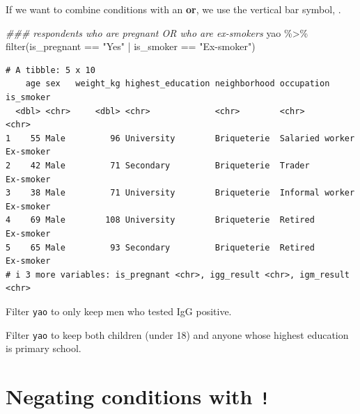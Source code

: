 \documentclass[
  letterpaper,
  DIV=11,
  numbers=noendperiod]{scrreprt}
\newenvironment{Shaded}{\begin{snugshade}}{\end{snugshade}}
\newcommand{\DocumentationTok}[1]{\textcolor[rgb]{0.37,0.37,0.37}{\textit{#1}}}
\newcommand{\FunctionTok}[1]{\textcolor[rgb]{0.28,0.35,0.67}{#1}}
\newcommand{\NormalTok}[1]{\textcolor[rgb]{0.00,0.23,0.31}{#1}}
\newcommand{\SpecialCharTok}[1]{\textcolor[rgb]{0.37,0.37,0.37}{#1}}
\newcommand{\StringTok}[1]{\textcolor[rgb]{0.13,0.47,0.30}{#1}}
\begin{document}
If we want to combine conditions with an \textbf{or}, we use the
vertical bar symbol, \texttt{\textbar{}}.

\begin{Shaded}
\begin{Highlighting}[]
\DocumentationTok{\#\#\# respondents who are pregnant OR who are ex{-}smokers}
\NormalTok{yao }\SpecialCharTok{\%\textgreater{}\%} \FunctionTok{filter}\NormalTok{(is\_pregnant }\SpecialCharTok{==} \StringTok{"Yes"} \SpecialCharTok{|}\NormalTok{ is\_smoker }\SpecialCharTok{==} \StringTok{"Ex{-}smoker"}\NormalTok{)}
\end{Highlighting}
\end{Shaded}

\begin{verbatim}
# A tibble: 5 x 10
    age sex   weight_kg highest_education neighborhood occupation      is_smoker
  <dbl> <chr>     <dbl> <chr>             <chr>        <chr>           <chr>    
1    55 Male         96 University        Briqueterie  Salaried worker Ex-smoker
2    42 Male         71 Secondary         Briqueterie  Trader          Ex-smoker
3    38 Male         71 University        Briqueterie  Informal worker Ex-smoker
4    69 Male        108 University        Briqueterie  Retired         Ex-smoker
5    65 Male         93 Secondary         Briqueterie  Retired         Ex-smoker
# i 3 more variables: is_pregnant <chr>, igg_result <chr>, igm_result <chr>
\end{verbatim}

\begin{tcolorbox}[enhanced jigsaw, colframe=quarto-callout-tip-color-frame, rightrule=.15mm, opacityback=0, breakable, coltitle=black, colbacktitle=quarto-callout-tip-color!10!white, bottomrule=.15mm, leftrule=.75mm, toprule=.15mm, arc=.35mm, bottomtitle=1mm, colback=white, left=2mm, opacitybacktitle=0.6, titlerule=0mm, title=\textcolor{quarto-callout-tip-color}{\faLightbulb}\hspace{0.5em}{Practice}, toptitle=1mm]

Filter \texttt{yao} to only keep men who tested IgG positive.

Filter \texttt{yao} to keep both children (under 18) and anyone whose
highest education is primary school.

\end{tcolorbox}

\hypertarget{negating-conditions-with}{%
\section{\texorpdfstring{Negating conditions with
\texttt{!}}{Negating conditions with !}}\label{negating-conditions-with}}
\end{document}

